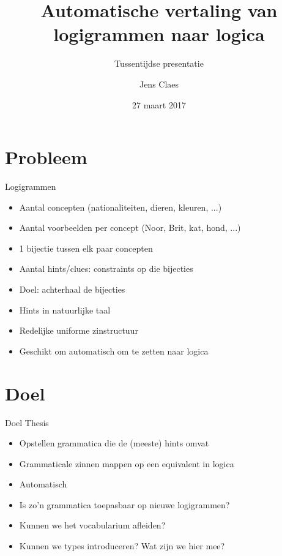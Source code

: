 \documentclass[notes, dvipsnames]{beamer}
\title{Automatische vertaling van logigrammen naar logica}
\subtitle{Tussentijdse presentatie}
\author{Jens Claes}
\date{27 maart 2017}
\newcommand{\seperation}{
	\vspace{1em}
	\ppause
}
\newcommand{\hitem}{
	\ppause
	\item
}
\newcommand{\ppause}{\onslide<+>}
\begin{document}
	\frame{\titlepage}
	\section{Probleem}
	\begin{frame}{Logigrammen}
		\begin{itemize}
      \hitem Aantal concepten (nationaliteiten, dieren, kleuren, ...)
      \item Aantal voorbeelden per concept (Noor, Brit, kat, hond, ...)
      \item 1 bijectie tussen elk paar concepten
      \item Aantal hints/clues: constraints op die bijecties
			\hitem Doel: achterhaal de bijecties
			
			\seperation
			
			\item Hints in natuurlijke taal
      \item Redelijke uniforme zinstructuur
			
			\seperation

      \item Geschikt om automatisch om te zetten naar logica
		\end{itemize}
	\end{frame}
	
	\section{Doel}
	\begin{frame}{Doel Thesis}
		\begin{itemize}
			\hitem Opstellen grammatica die de (meeste) hints omvat
			\item Grammaticale zinnen mappen op een equivalent in logica
      \item Automatisch
			
			\seperation
      \item Is zo'n grammatica toepasbaar op nieuwe logigrammen?
      \item Kunnen we het vocabularium afleiden?
      \item Kunnen we types introduceren? Wat zijn we hier mee?
		\end{itemize}
	\end{frame}
\end{document}
